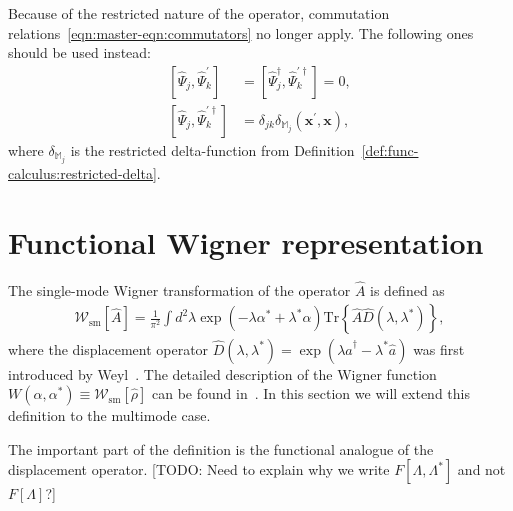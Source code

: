\documentclass[12pt,aip,jmp,amssymb,amsmath]{revtex4-1}
\begin{document}
Because of the restricted nature of the operator, commutation relations~\ref{eqn:master-eqn:commutators} no longer apply.
The following ones should be used instead:
\begin{equation}\label{eqn:func-operators:restricted-commutators}\begin{split}
    \left[ \hat{\Psi}_j, \hat{\Psi}_k^\prime \right]
    & = \left[ \hat{\Psi}_j^\dagger, \hat{\Psi}_k^{\prime\dagger} \right] = 0, \\
    \left[ \hat{\Psi}_j, \hat{\Psi}_k^{\prime\dagger} \right]
    & = \delta_{jk} \delta_{\mathbb{M}_j}(\boldsymbol{x}^\prime, \boldsymbol{x}),
\end{split}\end{equation}
where $\delta_{\mathbb{M}_j}$ is the restricted delta-function from Definition~\ref{def:func-calculus:restricted-delta}.



\section{Functional Wigner representation}

The single-mode Wigner transformation of the operator $\hat{A}$ is defined as
\begin{equation}\begin{split}
    \mathcal{W}_{\mathrm{sm}}[\hat{A}]
    = \frac{1}{\pi^2} \int d^2 \lambda \exp(-\lambda \alpha^* + \lambda^* \alpha)
        \mathrm{Tr} \left\{ \hat{A} \hat{D}(\lambda, \lambda^*) \right\},
\end{split}\end{equation}
where the displacement operator $\hat{D}(\lambda, \lambda^*) = \exp(\lambda \hat{a}^\dagger - \lambda^* \hat{a})$ was first introduced by Weyl~\cite{Weyl1950}.
The detailed description of the Wigner function $W(\alpha, \alpha^*) \equiv \mathcal{W}_{\mathrm{sm}}[\hat{\rho}]$ can be found in~\cite{Gardiner2004}.
In this section we will extend this definition to the multimode case.

The important part of the definition is the functional analogue of the displacement operator.
[TODO: Need to explain why we write $F[\Lambda, \Lambda^*]$ and not $F[\Lambda]$?]
\end{document}
